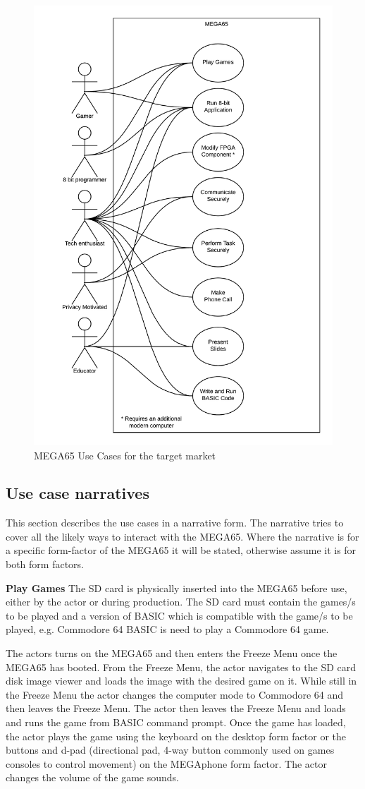 \begin{figure} \begin{center}
\includegraphics[width=.6\linewidth]{pics/MEGA65_use_case} 
\end{center} 
\caption{MEGA65 Use Cases for the target market\\}
\label{MEGA65_use_cases}
\end{figure}

\subsection{Use case narratives}
This section describes the use cases in a narrative form. The narrative tries to cover all the likely ways to interact with the MEGA65. Where the narrative is for a specific form-factor of the MEGA65 it will be stated, otherwise assume it is for both form factors. 

\textbf{Play Games}
The SD card is physically inserted into the MEGA65 before use, either by the actor or during production. The SD card must contain the games/s to be played and a version of BASIC which is compatible with the game/s to be played, e.g. Commodore 64 BASIC is need to play a Commodore 64 game.

The actors turns on the MEGA65 and then enters the Freeze Menu once the MEGA65 has booted. From the Freeze Menu, the actor navigates to the SD card disk image viewer and loads the image with the desired game on it. While still in the Freeze Menu the actor changes the computer mode to Commodore 64 and then leaves the Freeze Menu. The actor then leaves the Freeze Menu and loads and runs the game from BASIC command prompt. Once the game has loaded, the actor plays the game using the keyboard on the desktop form factor or the buttons and d-pad (directional pad, 4-way button commonly used on games consoles to control movement) on the MEGAphone form factor. The actor changes the volume of the game sounds.

